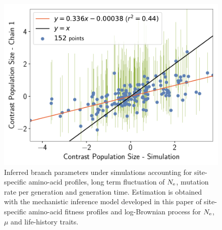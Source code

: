 \documentclass{article}
\begin{document}
\begin{figure}[H]
\begin{minipage}{0.32\linewidth}
			\includegraphics[width=\linewidth, page=1]{simulations/BranchWise_SimuDiv_SiteMutSelBranchNe_BranchCorrelation_ContrastPopulationSize}
		\end{minipage} \hfill
		\caption[Inferred branch parameters for \texttt{SimuDiv}]{
		Inferred branch parameters under simulations accounting for site-specific amino-acid profiles, long term fluctuation of $\Ne$, mutation rate per generation and generation time.
		Estimation is obtained with the mechanistic inference model developed in this paper of site-specific amino-acid fitness profiles and log-Brownian process for $\Ne$, $\mu$ and life-history traits.
		}
	\end{figure}

	\begin{table}[H]
		\centering
		\noindent{}
		\caption[Inferred amino-acids entropy for \texttt{SimuDiv}]{
			Estimated amino-acid entropy under simulations accounting for long term fluctuation of $\Ne$, mutation rate per generation and generation time.
			Estimation is obtained with the mechanistic inference model developed in this paper of site-specific amino-acid fitness profiles and log-Brownian process for $\Ne$, $\mu$ and life-history traits (in the left column), or under the assumption of constant $\Ne$ (in the right column).
		}
	\end{table}
\end{document}
